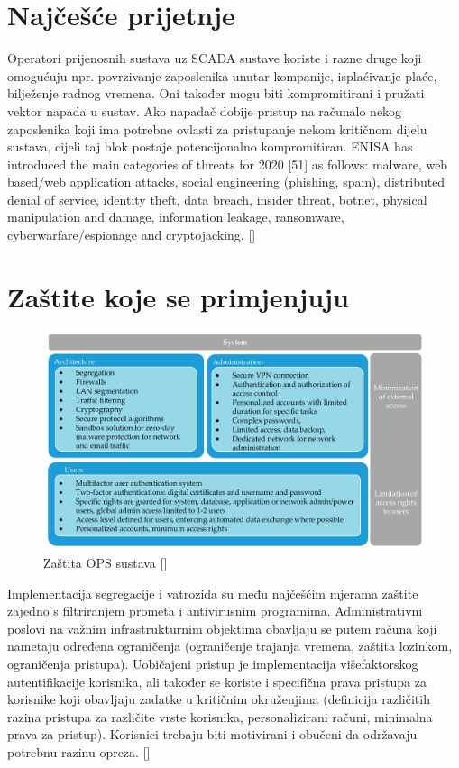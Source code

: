 \documentclass[times, utf8, zavrsni]{fer}
\begin{document}
\section{Najčešće prijetnje}
Operatori prijenosnih sustava uz SCADA sustave koriste i razne druge koji omogućuju npr. povrzivanje zaposlenika unutar kompanije, isplaćivanje plaće, bilježenje radnog vremena. Oni također mogu biti kompromitirani i pružati vektor napada u sustav. Ako napadač dobije pristup na računalo nekog zaposlenika koji ima potrebne ovlasti za pristupanje nekom kritičnom dijelu sustava, cijeli taj blok postaje potencijonalno kompromitiran. 
ENISA has introduced the main categories of threats for 2020 [51] as follows: malware, web based/web application attacks, social engineering (phishing, spam), distributed denial of service, identity theft, data breach, insider threat, botnet, physical manipulation and damage, information leakage, ransomware, cyberwarfare/espionage and cryptojacking. [\cite{tso-vuln}]
\section{Zaštite koje se primjenjuju}
\begin{figure}[htb]
\centering
\includegraphics[width=14cm]{slike/Zastita-tso-sustava.png}
\caption{Zaštita OPS sustava  [\cite{tso-vuln}]}
\label{fig:Zastita-ops-sustava}
\end{figure}
Implementacija segregacije i vatrozida su među najčešćim mjerama zaštite zajedno s filtriranjem prometa i antivirusnim programima. Administrativni poslovi na važnim infrastrukturnim objektima obavljaju se putem računa koji nametaju određena ograničenja (ograničenje trajanja vremena, zaštita lozinkom, ograničenja pristupa). Uobičajeni pristup je implementacija višefaktorskog autentifikacije korisnika, ali također se koriste i specifična prava pristupa za korisnike koji obavljaju zadatke u kritičnim okruženjima (definicija različitih razina pristupa za različite vrste korisnika, personalizirani računi, minimalna prava za pristup). Korisnici trebaju biti motivirani i obučeni da održavaju potrebnu razinu opreza. [\cite{tso-vuln}] 
\end{document}
